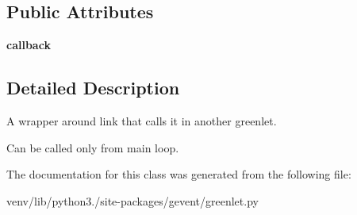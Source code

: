 \subsection*{Public Attributes}
\begin{DoxyCompactItemize}
\item 
\mbox{\label{classgevent_1_1greenlet_1_1_spawned_link_ae40b4902404ef1b3e04621ff581509f1}} 
{\bfseries callback}
\end{DoxyCompactItemize}


\subsection{Detailed Description}
\begin{DoxyVerb}A wrapper around link that calls it in another greenlet.

Can be called only from main loop.
\end{DoxyVerb}
 

The documentation for this class was generated from the following file\+:\begin{DoxyCompactItemize}
\item 
venv/lib/python3./site-\/packages/gevent/greenlet.\+py\end{DoxyCompactItemize}
